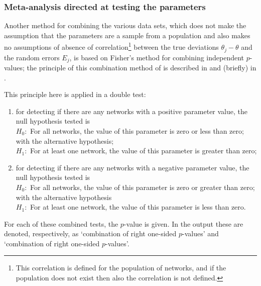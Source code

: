\documentclass[a4paper,fleqn,11pt]{article}
\newcommand{\+}{\, + \,}
\begin{document}
\subsubsection{Meta-analysis directed at testing the parameters}

Another method for combining the various data sets,
which does not make the assumption
that the parameters are a sample from a population and also
makes no assumptions of absence of correlation\footnote{This correlation
is defined for the population of networks, and if the population
does not exist then also the correlation is not defined.}
between the true deviations $\theta_j - \theta$
and the random errors $E_j$,
is based on Fisher's method for combining independent $p$-values;
the principle of this combination method of \citet{Fisher32} is described in
\citet{HedgesOlkin85}    and (briefly) in \citet[Chapter 3]{SnijdersBosker12}.

This principle here is applied in a double test:
\begin{enumerate}
\item for detecting if there are any networks with a positive parameter value,
         the null hypothesis tested is\\
       $H_0 :$   For all networks, the value of this parameter
            is zero or less than zero;\\
            with the alternative hypothesis;\\
        $H_1 :$
             For at least one network, the value of this parameter
             is greater than zero;
\item for detecting if there are any networks with a negative parameter value,
         the null hypothesis tested is\\
            $H_0 :$ For all networks, the value of this parameter
                  is zero or greater than zero;\\
            with the alternative hypothesis\\
            $H_1 :$ For at least one network, the value of this parameter
                   is less than zero.
\end{enumerate}
      For each of these combined tests, the $p$-value is given.
      In the output these are denoted, respectively,
      as `combination of right one-sided $p$-values' and
      `combination of right one-sided $p$-values'.
\end{document}
